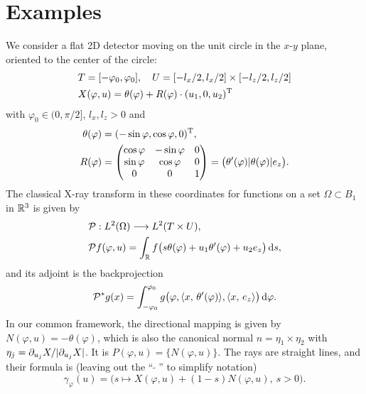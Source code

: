 \documentclass{amsart}
\renewcommand*{\phi}{\varphi}
\begin{document}
\section{Examples}



\begin{example}
 We consider a flat 2D detector moving on the unit circle in the $x$-$y$ plane, oriented to the center of the circle:
 \begin{align*}
  & T = [-\phi_0, \phi_0],\quad U = [-l_x/2, l_x/2] \times [-l_z/2, l_z/2] \\
  & X(\phi, u) = \theta(\phi) + R(\phi) \cdot \TRANSP{(u_1, 0, u_2)}
 \end{align*}
 with $\phi_0 \in (0, \pi/2]$, $l_x, l_z > 0$ and
 \begin{align}
  \theta(\phi) &= \TRANSP{(-\sin\phi, \cos\phi, 0)}, \\ 
  R(\phi) &=
  \begin{pmatrix}
   \cos\phi & -\sin\phi & 0 \\
   \sin\phi & \cos\phi & 0 \\
   0 & 0 & 1
  \end{pmatrix}
  = \big(\theta'(\phi) | \theta(\phi) | e_z\big).
 \end{align}
 The classical X-ray transform in these coordinates for functions on a set $\Omega \subset B_1$ in ${\mathbb{R}}^3$ is given by
 \begin{align}
  &\OPP: L^2(\Omega) \Lto L^2(T \times U), \notag \\
  \label{eq:parallel_fwdproj}
  &\OPP f(\phi, u) = \int_\RR f\big(s\theta(\phi) + u_1 \theta'(\phi) + u_2 e_z\big)\, \D s,
 \end{align}
 and its adjoint is the backprojection
 \begin{equation}
  \label{eq:parallel_backproj}
  \DUALOPP g(x) = \int_{-\phi_0}^{\phi_0} g\big(\phi, \INNER{x}{\theta'(\phi)}, \INNER{x}{e_z}\big)\, \D \phi.
 \end{equation}
 In our common framework, the directional mapping is given by $N(\phi, u) = -\theta(\phi)$, which is also the canonical normal 
 $n = \eta_1 \times \eta_2$ with $\eta_j = \partial_{u_j} X / |\partial_{u_j} X|$. It is $P(\phi, u) = \lbrace N(\phi, u)\rbrace$.
 The rays are straight lines, and their formula is (leaving out the ``$\,\widetilde{\ }\,$'' to simplify notation)
 \begin{equation*}
  \gamma_\phi(u) = \big( s \mapsto X(\phi, u) + (1-s) N(\phi, u),\ s > 0 \big).

\end{equation*}
\end{example}
\end{document}
